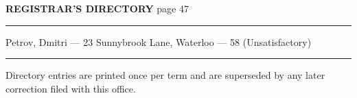 \documentclass[11pt]{article}
\begin{document}
{\bfseries REGISTRAR'S DIRECTORY} \hfill {\footnotesize page 47}

\vspace{0.4em}
\hrule
\vspace{1.5em}

Petrov, Dmitri --- 23 Sunnybrook Lane, Waterloo --- 58 (Unsatisfactory)

\vspace{1.5em}
\hrule
\vspace{0.6em}

{\footnotesize Directory entries are printed once per term and are superseded by
any later correction filed with this office.}
\end{document}
